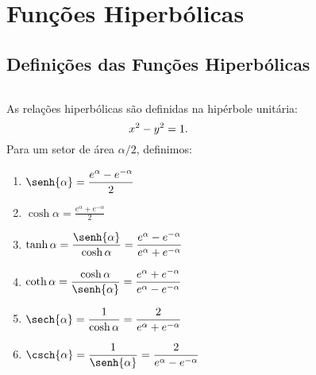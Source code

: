 \section{Funções Hiperbólicas}

\subsection{Definições das Funções Hiperbólicas}
\begin{frame}
  \begin{columns}[onlytextwidth]
    \begin{column}{0.49\textwidth}\vspace*{-0.5cm}
      \begin{definition}
        As relações hiperbólicas são definidas na hipérbole unitária:\vspace*{-0.35cm}
        \begin{equation*}
          x^{2} - y^{2} = 1.\vspace*{-0.35cm}
        \end{equation*}
        Para um setor de área $\alpha/2$, definimos:
        \begin{enumerate}
          \item $\displaystyle\senh{\alpha} = \frac{e^{\alpha}-e^{-\alpha}}{2}$
          \item $\displaystyle\cosh{\alpha} = \frac{e^{\alpha}+e^{-\alpha}}{2}$
          \item $\displaystyle\tanh{\alpha} = \frac{\senh{\alpha}}{\cosh{\alpha}} = \frac{e^{\alpha}-e^{-\alpha}}{e^{\alpha}+e^{-\alpha}}$
          \item $\displaystyle\coth{\alpha} = \frac{\cosh{\alpha}}{\senh{\alpha}} = \frac{e^{\alpha}+e^{-\alpha}}{e^{\alpha}-e^{-\alpha}}$
          \item $\displaystyle\sech{\alpha} = \frac{1}{\cosh{\alpha}} = \frac{2}{e^{\alpha}+e^{-\alpha}}$
          \item $\displaystyle\csch{\alpha} = \frac{1}{\senh{\alpha}} = \frac{2}{e^{\alpha}-e^{-\alpha}}$
        \end{enumerate}
      \end{definition}
    \end{column}
    \begin{column}{0.49\textwidth}\vspace*{-0.5cm}
      \begin{figure}
      \end{figure}
    \end{column}
  \end{columns}
\end{frame}

